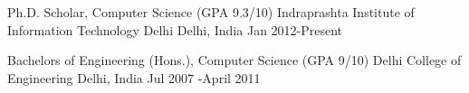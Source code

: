 \begin{cventries}
  \cventry
    {Ph.D. Scholar, Computer Science (GPA 9.3/10)}
    {Indraprashta Institute of Information Technology Delhi}
    {Delhi, India}
    {Jan 2012-Present}
	
	
  \cventry
   {Bachelors of Engineering (Hons.), Computer Science (GPA 9/10)}
   {Delhi College of Engineering}
   {Delhi, India}
   {Jul 2007 -April 2011}
   
  \end{cventries}
